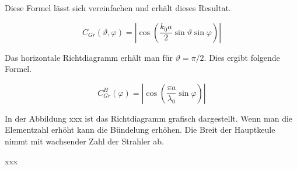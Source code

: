 Diese Formel lässt sich vereinfachen und erhält dieses Resultat.

\begin{equation}
C_{Gr}(\vartheta,\varphi) = \left|  \cos \left( \dfrac{k_{0} a}{2} \sin \vartheta \sin\varphi \right) \right| 
\end{equation} 

Das horizontale Richtdiagramm erhält man für $ \vartheta = \pi / 2 $. Dies ergibt folgende Formel.

\begin{equation}
C_{Gr}^{H}(\varphi) = \left|  \cos \left( \dfrac{\pi a}{\lambda_{0}} \sin \varphi \right) \right| 
\end{equation} 

In der Abbildung xxx ist das Richtdiagramm grafisch dargestellt. Wenn man die Elementzahl erhöht kann die Bündelung erhöhen. Die Breit der Hauptkeule nimmt mit wachsender Zahl der Strahler ab.  

xxx